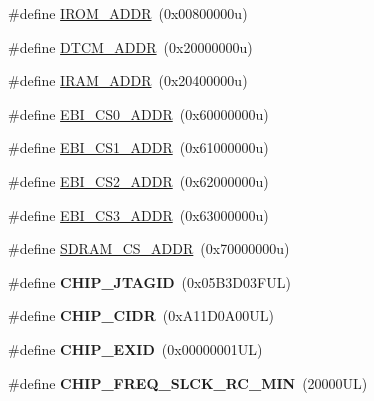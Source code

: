 \begin{DoxyCompactItemize}
\item 
\#define \mbox{\hyperlink{group__SAMS70N19__definitions_ga694212ffb8c2786bacee3d0ad6020bda}{I\+R\+O\+M\+\_\+\+A\+D\+DR}}~(0x00800000u)
\item 
\#define \mbox{\hyperlink{group__SAMS70N19__definitions_ga26626a425f7ebb3a0c2dbc276f0d9f78}{D\+T\+C\+M\+\_\+\+A\+D\+DR}}~(0x20000000u)
\item 
\#define \mbox{\hyperlink{group__SAMS70N19__definitions_gaae45ac2ef16942159481c767ac4805cf}{I\+R\+A\+M\+\_\+\+A\+D\+DR}}~(0x20400000u)
\item 
\#define \mbox{\hyperlink{group__SAMS70N19__definitions_ga9bcbb97ddae3b2cc5e2c9613d33f66b4}{E\+B\+I\+\_\+\+C\+S0\+\_\+\+A\+D\+DR}}~(0x60000000u)
\item 
\#define \mbox{\hyperlink{group__SAMS70N19__definitions_gaaddd9fdbbc77c9aced5308819f502a26}{E\+B\+I\+\_\+\+C\+S1\+\_\+\+A\+D\+DR}}~(0x61000000u)
\item 
\#define \mbox{\hyperlink{group__SAMS70N19__definitions_ga058a35f9991487dc2dd12ada792d0730}{E\+B\+I\+\_\+\+C\+S2\+\_\+\+A\+D\+DR}}~(0x62000000u)
\item 
\#define \mbox{\hyperlink{group__SAMS70N19__definitions_gad66ebdd0fc33ec3cf85dbaa14bbf05d9}{E\+B\+I\+\_\+\+C\+S3\+\_\+\+A\+D\+DR}}~(0x63000000u)
\item 
\#define \mbox{\hyperlink{group__SAMS70N19__definitions_ga61b7db25daf759c2a2beb6e5a0b57a84}{S\+D\+R\+A\+M\+\_\+\+C\+S\+\_\+\+A\+D\+DR}}~(0x70000000u)
\item 
\mbox{\label{group__SAMS70N19__definitions_gaa614519778eec0df55d3eeab3223e3f6}} 
\#define {\bfseries C\+H\+I\+P\+\_\+\+J\+T\+A\+G\+ID}~(0x05\+B3\+D03\+F\+U\+L)
\item 
\mbox{\label{group__SAMS70N19__definitions_ga1e1ae44dd9269a8a98c1d7e7a60e9fbd}} 
\#define {\bfseries C\+H\+I\+P\+\_\+\+C\+I\+DR}~(0x\+A11\+D0\+A00\+U\+L)
\item 
\mbox{\label{group__SAMS70N19__definitions_ga35123717aa86b76bb6b73cf3adc4c2e6}} 
\#define {\bfseries C\+H\+I\+P\+\_\+\+E\+X\+ID}~(0x00000001\+U\+L)
\item 
\mbox{\label{group__SAMS70N19__definitions_ga0e868bf27426399dfdcb3a9dfc3733c4}} 
\#define {\bfseries C\+H\+I\+P\+\_\+\+F\+R\+E\+Q\+\_\+\+S\+L\+C\+K\+\_\+\+R\+C\+\_\+\+M\+IN}~(20000\+U\+L)

\end{DoxyCompactItemize}
